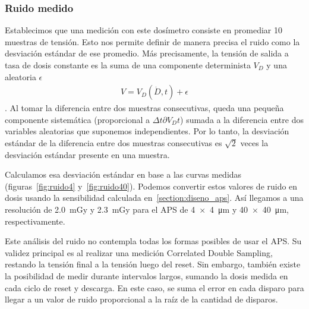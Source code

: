 \subsubsection{Ruido medido}
Establecimos que una medición con este dosímetro consiste en promediar 10
muestras de tensión.
Esto nos permite definir de manera precisa el ruido como la desviación estándar
de ese promedio.
Más precisamente, la tensión de salida a tasa de dosis constante
es la suma de una componente determinista $V_D$ y una aleatoria $\epsilon$
\begin{align*}
    V = V_D(\dot D, t) + \epsilon
\end{align*}. 
Al tomar la diferencia entre dos muestras consecutivas,
queda una pequeña componente sistemática 
(proporcional a $\Delta t\partial{V_D}{t}$) 
sumada a la diferencia entre dos variables aleatorias que suponemos
independientes.
Por lo tanto, 
la desviación estándar de la diferencia entre dos muestras consecutivas
es $\sqrt 2$ veces la desviación estándar presente en una muestra.

Calculamos esa desviación estándar en base a las curvas medidas
(figuras~\ref{fig:ruido4} y~\ref{fig:ruido40}).
Podemos convertir estos valores de ruido en dosis usando la sensibilidad
calculada en~\ref{section:diseno_aps}.
Así llegamos a una resolución de \SI{2.0}{\milli\gray} y \SI{2.3}{\milli\gray}
para el APS de \SI{4x4}{\micro\meter} y \SI{40x40}{\micro\meter},
    respectivamente.

Este análisis del ruido no contempla todas los formas posibles
de usar el APS.
Su validez principal es al realizar una medición Correlated Double Sampling,
restando la tensión final a la tensión luego del reset.
Sin embargo,
también existe la posibilidad de medir durante intervalos largos,
sumando la dosis medida en cada ciclo de reset y descarga.
En este caso, se suma el error en cada disparo para llegar a un valor de ruido
proporcional a la raíz de la cantidad de disparos.
%
